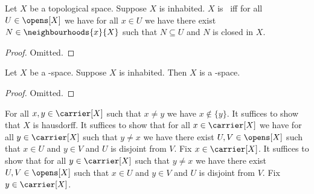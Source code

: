 \begin{proposition}\label{teethree_iff_closed_neighbourhood_in_open}
    Let $X$ be a topological space.
    Suppose $X$ is inhabited.
    $X$ is \teethree\ iff for all $U \in \opens[X]$ we have for all $x \in U$ we have there exist $N \in \neighbourhoods{x}{X}$ such that $N \subseteq U$ and $N$ is closed in $X$.    
\end{proposition}
\begin{proof}
    Omitted.
\end{proof}


\begin{proposition}\label{teethree_space_is_teetwo_space}
    Let $X$ be a \teethree-space.
    Suppose $X$ is inhabited.
    Then $X$ is a \teetwo-space.
\end{proposition}
\begin{proof}
    Omitted.
\end{proof}
    For all $x,y \in \carrier[X]$ such that $x \neq y$ we have $x \notin \{y\}$.
    It suffices to show that $X$ is hausdorff.
    It suffices to show that for all $x \in \carrier[X]$ we have for all $y \in \carrier[X]$ such that $y \neq x$ we have there exist $U,V \in \opens[X]$ such that $x\in U$ and $y \in V$ and $U$ is disjoint from $V$.
    Fix $x \in \carrier[X]$.
    It suffices to show that for all $y \in \carrier[X]$ such that $y \neq x$ we have there exist $U,V \in \opens[X]$ such that $x\in U$ and $y \in V$ and $U$ is disjoint from $V$.
    Fix $y \in \carrier[X]$.


